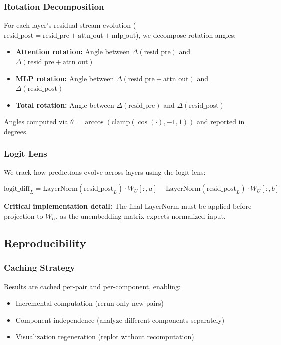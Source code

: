 \documentclass{article}
\begin{document}
\subsubsection{Rotation Decomposition}

For each layer's residual stream evolution ($\text{resid\_post} = \text{resid\_pre} + \text{attn\_out} + \text{mlp\_out}$), we decompose rotation angles:

\begin{itemize}
    \item \textbf{Attention rotation:} Angle between $\Delta(\text{resid\_pre})$ and $\Delta(\text{resid\_pre} + \text{attn\_out})$
    \item \textbf{MLP rotation:} Angle between $\Delta(\text{resid\_pre} + \text{attn\_out})$ and $\Delta(\text{resid\_post})$
    \item \textbf{Total rotation:} Angle between $\Delta(\text{resid\_pre})$ and $\Delta(\text{resid\_post})$
\end{itemize}

Angles computed via $\theta = \arccos(\text{clamp}(\cos(\cdot), -1, 1))$ and reported in degrees.

\subsubsection{Logit Lens}

We track how predictions evolve across layers using the logit lens:

\begin{equation}
\text{logit\_diff}_L = \text{LayerNorm}(\text{resid\_post}_L) \cdot W_U[:, a] - \text{LayerNorm}(\text{resid\_post}_L) \cdot W_U[:, b]
\end{equation}

\textbf{Critical implementation detail:} The final LayerNorm must be applied before projection to $W_U$, as the unembedding matrix expects normalized input.

\subsection{Reproducibility}

\subsubsection{Caching Strategy}

Results are cached per-pair and per-component, enabling:
\begin{itemize}
    \item Incremental computation (rerun only new pairs)
    \item Component independence (analyze different components separately)
    \item Visualization regeneration (replot without recomputation)
\end{itemize}
\end{document}
